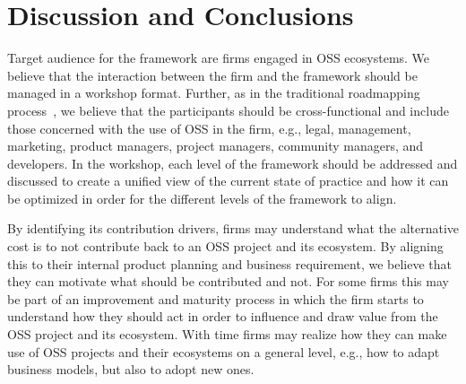 \documentclass[a4paper]{llncs}
\begin{document}
\section{Discussion and Conclusions}
\vspace{-0.3cm}
Target audience for the framework are firms engaged in OSS ecosystems. We believe that the interaction between the firm and the framework should be managed in a workshop format. Further, as in the traditional roadmapping process~\cite{Komssi2015}, we believe that the participants should be cross-functional and include those concerned with the use of OSS in the firm, e.g., legal, management, marketing, product managers, project managers, community managers, and developers. In the workshop, each level of the framework should be addressed and discussed to create a unified view of the current state of practice and how it can be optimized in order for the different levels of the framework to align. 

By identifying its contribution drivers, firms may understand what the alternative cost is to not contribute back to an OSS project and its ecosystem. By aligning this to their internal product planning and business requirement, we believe that they can motivate what should be contributed and not. 
For some firms this may be part of an improvement and maturity process in which the firm starts to understand how they should act in order to influence and draw value from the OSS project and its ecosystem. With time firms may realize how they can make use of OSS projects and their ecosystems on a general level, e.g., how to adapt business models, but also to adopt new ones. 
\end{document}
